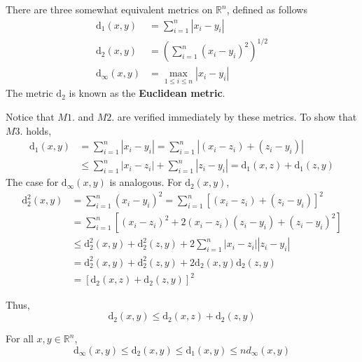 \begin{example}
	There are three somewhat equivalent metrics on $\mathbb{R}^n$, defined as follows
	\begin{equation*}
		\begin{aligned}
			\mathrm{d}_1(x,y) &= \sum_{i=1}^n |x_i - y_i| \\
			\mathrm{d}_2(x,y) &= \left(\sum_{i=1}^n (x_i - y_i)^2 \right)^{1/2} \\
			\mathrm{d}_\infty(x,y) &= \max_{1 \leq i \leq n}{|x_i - y_i|}
		\end{aligned}
	\end{equation*}
	The metric $\mathrm{d}_2$ is known as the \textbf{Euclidean metric}.

	Notice that $M1.$ and $M2.$ are verified immediately by these metrics. To show that $M3.$ holds,
	\begin{equation*}
		\begin{aligned}
			\mathrm{d}_1(x,y) &= \sum_{i=1}^n |x_i - y_i| = \sum_{i=1}^n |(x_i - z_i) + (z_i - y_i)| \\
			&\leq \sum_{i=1}^n |x_i - z_i| + \sum_{i=1}^n |z_i - y_i| = \mathrm{d}_1(x,z) + \mathrm{d}_1(z,y)
		\end{aligned}
	\end{equation*}
	The case for $\mathrm{d}_\infty(x,y)$ is analogous. For $\mathrm{d}_2(x,y)$,
	\begin{equation*}
		\begin{aligned}
			\mathrm{d}_2^2(x,y) &= \sum_{i=1}^n (x_i - y_i)^2 = \sum_{i=1}^n [(x_i - z_i) + (z_i - y_i)]^2 \\
			&= \sum_{i=1}^n [(x_i - z_i)^2 + 2(x_i - z_i)(z_i - y_i) + (z_i - y_i)^2] \\
			&\leq \mathrm{d}_2^2(x,y) + \mathrm{d}_2^2(z,y) + 2 \sum_{i=1}^n |x_i - z_i||z_i - y_i| \\
			&= \mathrm{d}_2^2(x,y) + \mathrm{d}_2^2(z,y) + 2 \mathrm{d}_2(x,y)\mathrm{d}_2(z,y) \\
			&= [\mathrm{d}_2(x,z) + \mathrm{d}_2(z,y)]^2
		\end{aligned}
	\end{equation*}

	Thus,
	\[
		\mathrm{d}_2(x,y) \leq \mathrm{d}_2(x,z) + \mathrm{d}_2(z,y)
	\]
\end{example}

\begin{lemma}
	For all $x,y \in \mathbb{R}^n$,
	\begin{equation*}
		\mathrm{d}_{\infty}(x,y) \leq \mathrm{d}_2(x,y) \leq \mathrm{d}_1(x,y) \leq nd_\infty (x,y)
	\end{equation*}
\end{lemma}

